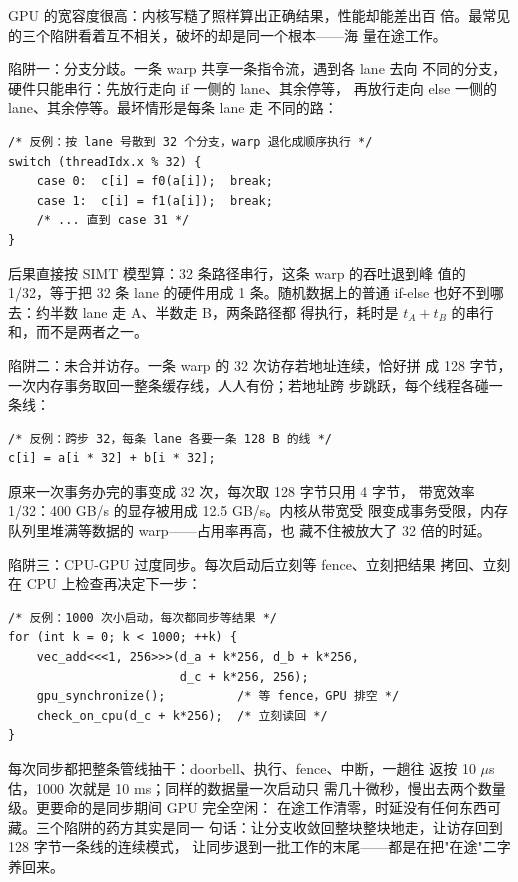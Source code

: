 GPU 的宽容度很高：内核写糙了照样算出正确结果，性能却能差出百
倍。最常见的三个陷阱看着互不相关，破坏的却是同一个根本——海
量在途工作。

陷阱一：分支分歧。一条 warp 共享一条指令流，遇到各 lane 去向
不同的分支，硬件只能串行：先放行走向 if 一侧的 lane、其余停等，
再放行走向 else 一侧的 lane、其余停等。最坏情形是每条 lane 走
不同的路：

\begin{lstlisting}
/* 反例：按 lane 号散到 32 个分支，warp 退化成顺序执行 */
switch (threadIdx.x % 32) {
    case 0:  c[i] = f0(a[i]);  break;
    case 1:  c[i] = f1(a[i]);  break;
    /* ... 直到 case 31 */
}
\end{lstlisting}

后果直接按 SIMT 模型算：32 条路径串行，这条 warp 的吞吐退到峰
值的 1/32，等于把 32 条 lane 的硬件用成 1 条。随机数据上的普通
if-else 也好不到哪去：约半数 lane 走 A、半数走 B，两条路径都
得执行，耗时是 $t_A+t_B$ 的串行和，而不是两者之一。

陷阱二：未合并访存。一条 warp 的 32 次访存若地址连续，恰好拼
成 128 字节，一次内存事务取回一整条缓存线，人人有份；若地址跨
步跳跃，每个线程各碰一条线：

\begin{lstlisting}
/* 反例：跨步 32，每条 lane 各要一条 128 B 的线 */
c[i] = a[i * 32] + b[i * 32];
\end{lstlisting}

原来一次事务办完的事变成 32 次，每次取 128 字节只用 4 字节，
带宽效率 1/32：400 GB/s 的显存被用成 12.5 GB/s。内核从带宽受
限变成事务受限，内存队列里堆满等数据的 warp——占用率再高，也
藏不住被放大了 32 倍的时延。

陷阱三：CPU-GPU 过度同步。每次启动后立刻等 fence、立刻把结果
拷回、立刻在 CPU 上检查再决定下一步：

\begin{lstlisting}
/* 反例：1000 次小启动，每次都同步等结果 */
for (int k = 0; k < 1000; ++k) {
    vec_add<<<1, 256>>>(d_a + k*256, d_b + k*256,
                        d_c + k*256, 256);
    gpu_synchronize();          /* 等 fence，GPU 排空 */
    check_on_cpu(d_c + k*256);  /* 立刻读回 */
}
\end{lstlisting}

每次同步都把整条管线抽干：doorbell、执行、fence、中断，一趟往
返按 10 $\mu$s 估，1000 次就是 10 ms；同样的数据量一次启动只
需几十微秒，慢出去两个数量级。更要命的是同步期间 GPU 完全空闲：
在途工作清零，时延没有任何东西可藏。三个陷阱的药方其实是同一
句话：让分支收敛回整块整块地走，让访存回到 128 字节一条线的连续模式，
让同步退到一批工作的末尾——都是在把"在途"二字养回来。

